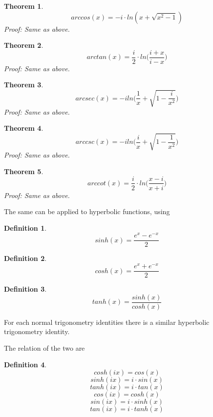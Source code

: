 \documentclass[a4paper]{article}
\numberwithin{equation}{subsection}
\newtheorem{theorem}{Theorem}[section]
\newtheorem{definition}{Definition}[section]
\begin{document}
\begin{theorem}
$$arccos(x) = -i \cdot ln(x + \sqrt{ x^2 - 1} )$$
Proof: Same as above.
\end{theorem}

\begin{theorem}
$$arctan(x) = \frac{i}{2} \cdot ln\Big(\frac{i+x}{i-x}\Big)$$
Proof: Same as above.
\end{theorem}

\begin{theorem}
$$arcsec(x) = -i ln \Big( \frac{1}{x}  + \sqrt{1 - \frac{i}{x^2}} \Big)$$
Proof: Same as above.
\end{theorem}

\begin{theorem}
$$arccsc(x) = -i ln \Big( \frac{i}{x}  + \sqrt{1 - \frac{1}{x^2}} \Big)$$
Proof: Same as above.
\end{theorem}

\begin{theorem}
$$arccot(x) = \frac{i}{2} \cdot ln\Big(\frac{x-i}{x+i}\Big)$$
Proof: Same as above.
\end{theorem}

The same can be applied to hyperbolic functions, using

\begin{definition}
$$sinh(x) = \frac{e^x - e^{-x}}{2} $$
\end{definition}

\begin{definition}
$$cosh(x) = \frac{e^x + e^{-x}}{2} $$
\end{definition}

\begin{definition}
$$tanh(x) = \frac{sinh(x)}{cosh(x)} $$
\end{definition}

For each normal trigonometry identities there is a similar hyperbolic trigonometry identity.

The relation of the two are
\begin{definition}
$$cosh(ix) = cos(x)$$
$$sinh(ix) = i \cdot sin(x)$$
$$tanh(ix) = i \cdot tan(x)$$
$$cos(ix) = cosh(x)$$
$$sin(ix) = i \cdot sinh(x)$$
$$tan(ix) = i \cdot tanh(x)$$
\end{definition}
\end{document}
